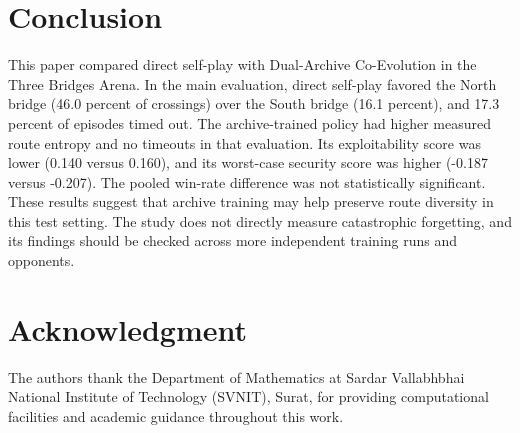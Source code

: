 \documentclass[conference]{IEEEtran}
\begin{document}
\section{Conclusion}
This paper compared direct self-play with Dual-Archive Co-Evolution in the Three Bridges Arena. In the main evaluation, direct self-play favored the North bridge (46.0 percent of crossings) over the South bridge (16.1 percent), and 17.3 percent of episodes timed out. The archive-trained policy had higher measured route entropy and no timeouts in that evaluation. Its exploitability score was lower (0.140 versus 0.160), and its worst-case security score was higher (-0.187 versus -0.207). The pooled win-rate difference was not statistically significant. These results suggest that archive training may help preserve route diversity in this test setting. The study does not directly measure catastrophic forgetting, and its findings should be checked across more independent training runs and opponents.

\section*{Acknowledgment}
The authors thank the Department of Mathematics at Sardar Vallabhbhai National Institute of Technology (SVNIT), Surat, for providing computational facilities and academic guidance throughout this work.
\end{document}
